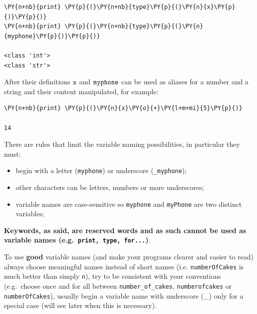 \begin{codebox}[breakable, size=fbox, boxrule=1pt, pad at break*=1mm, colback=cellbackground, colframe=cellborder]
\begin{Verbatim}[commandchars=\\\{\}]
\PY{n+nb}{print} \PY{p}{(}\PY{n+nb}{type}\PY{p}{(}\PY{n}{x}\PY{p}{)}\PY{p}{)}
\PY{n+nb}{print} \PY{p}{(}\PY{n+nb}{type}\PY{p}{(}\PY{n}{myphone}\PY{p}{)}\PY{p}{)}

<class 'int'>
<class 'str'>
\end{Verbatim}
\end{codebox}

After their definitions \(\tt{x}\) and \(\tt{myphone}\) can be used as aliases for a number and a string and their content manipulated, for example:

\begin{codebox}[breakable, size=fbox, boxrule=1pt, pad at break*=1mm, colback=cellbackground, colframe=cellborder]
\begin{Verbatim}[commandchars=\\\{\}]
\PY{n+nb}{print} \PY{p}{(}\PY{n}{x}\PY{o}{+}\PY{l+m+mi}{5}\PY{p}{)}

14
\end{Verbatim}
\end{codebox}

There are rules that limit the variable naming possibilities, in particular they must:
\begin{itemize}
	\tightlist
\item begin with a letter (\texttt{myphone}) or underscore (\texttt{\_myphone});
\item other characters can be letters, numbers or more underscores;
\item variable names are case-sensitive so \texttt{myphone} and \texttt{myPhone} are two distinct variables;
\end{itemize}

\textbf{Keywords, as said, are reserved words and as such cannot be used as variable names (e.g.~\texttt{print, type, for...})}.

To use \textbf{good} variable names (and make your programs clearer and easier to read) always choose meaningful names instead of short names (i.e. \texttt{numberOfCakes} is much better than simply \texttt{n}), try to be consistent with your conventions (e.g.~choose once and for all between \texttt{number\_of\_cakes}, \texttt{numberofcakes} or \texttt{numberOfCakes}), usually begin a variable name with underscore (\_) only for a special case (will see later when this is necessary).

